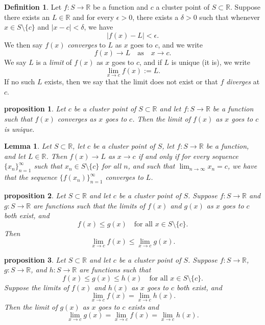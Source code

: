 \documentclass{article}
\newtheorem{lemma}{Lemma}[section]
\newtheorem{proposition}{Proposition}[section]
\newtheorem{proposition}{proposition}[section]
\theoremstyle{definition}
\newtheorem{definition}{Definition}[section]
\theoremstyle{remark}
\begin{document}
\begin{definition}
Let $f : S \to \mathbb{R}$ be a function and $c$ a cluster point of $S \subset \mathbb{R}$. Suppose there exists an $L \in \mathbb{R}$ and for every $\epsilon > 0$, there exists a $\delta > 0$ such that whenever $x \in S \setminus \{c\}$ and $|x - c| < \delta$, we have
\[
|f(x) - L| < \epsilon.
\]
We then say $f(x)$ \textit{converges} to $L$ as $x$ goes to $c$, and we write
\[
f(x) \to L \quad \text{as} \quad x \to c.
\]
We say $L$ is a \textit{limit} of $f(x)$ as $x$ goes to $c$, and if $L$ is unique (it is), we write
\[
\lim_{x\to c} f(x) := L.
\]
If no such $L$ exists, then we say that the limit does not exist or that $f$ \textit{diverges} at $c$.

\end{definition}

\begin{proposition}
Let $c$ be a cluster point of $S \subset \mathbb{R}$ and let $f : S \to \mathbb{R}$ be a function such that $f(x)$ converges as $x$ goes to $c$. Then the limit of $f(x)$ as $x$ goes to $c$ is unique.
\end{proposition}



\begin{lemma}
Let $S \subset \mathbb{R}$, let $c$ be a cluster point of $S$, let $f : S \to \mathbb{R}$ be a function, and let $L \in \mathbb{R}$. Then $f(x) \to L$ as $x \to c$ if and only if for every sequence $\{x_n\}_{n=1}^{\infty}$ such that $x_n \in S \setminus \{c\}$ for all $n$, and such that $\lim_{n\to\infty} x_n = c$, we have that the sequence $\{f(x_n)\}_{n=1}^{\infty}$ converges to $L$.
\end{lemma}






\begin{proposition}
Let $S \subset \mathbb{R}$ and let $c$ be a cluster point of $S$. Suppose $f : S \to \mathbb{R}$ and $g : S \to \mathbb{R}$ are functions such that the limits of $f(x)$ and $g(x)$ as $x$ goes to $c$ both exist, and
\[
f(x) \leq g(x) \quad \text{for all } x \in S \setminus \{c\}.
\]
Then
\[
\lim_{x\to c} f(x) \leq \lim_{x\to c} g(x).
\]
\end{proposition}

\begin{proposition}
Let $S \subset \mathbb{R}$ and let $c$ be a cluster point of $S$. Suppose $f : S \to \mathbb{R}$, $g : S \to \mathbb{R}$, and $h : S \to \mathbb{R}$ are functions such that
\[
f(x) \leq g(x) \leq h(x) \quad \text{for all } x \in S \setminus \{c\}.
\]
Suppose the limits of $f(x)$ and $h(x)$ as $x$ goes to $c$ both exist, and
\[
\lim_{x\to c} f(x) = \lim_{x\to c} h(x).
\]
Then the limit of $g(x)$ as $x$ goes to $c$ exists and
\[
\lim_{x\to c} g(x) = \lim_{x\to c} f(x) = \lim_{x\to c} h(x).
\]
\end{proposition}
\end{document}
